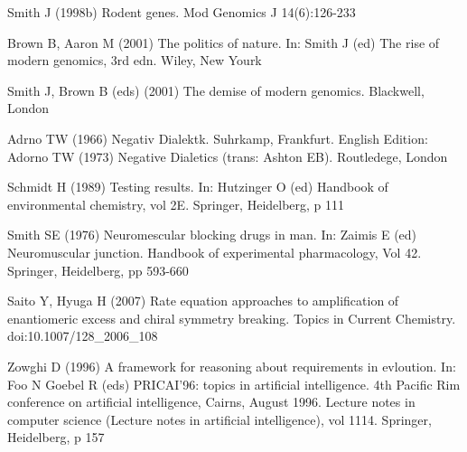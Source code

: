 \documentclass{EPS}
\begin{document}
\begin{thebibliography}{}
Smith J (1998b)
Rodent genes. Mod Genomics J 14(6):126-233

Brown B, Aaron M (2001)
The politics of nature. In: Smith J (ed)
The rise of modern genomics, 3rd edn. Wiley, New Yourk

Smith J, Brown B (eds) (2001)
The demise of modern genomics. Blackwell, London

Adrno TW (1966)
Negativ Dialektk. Suhrkamp, Frankfurt.
English Edition: Adorno TW (1973)
Negative Dialetics (trans: Ashton EB). Routledege, London

Schmidt H (1989)
Testing results. In: Hutzinger O (ed)
Handbook of environmental chemistry, vol 2E.
Springer, Heidelberg, p 111

Smith SE (1976)
Neuromescular blocking drugs in man.
In: Zaimis E (ed) Neuromuscular junction.
Handbook of experimental pharmacology, Vol 42.
Springer, Heidelberg, pp 593-660

Saito Y, Hyuga H (2007)
Rate equation approaches to amplification of enantiomeric excess
and chiral symmetry breaking.
Topics in Current Chemistry. doi:10.1007/128\_2006\_108

Zowghi D (1996)
A framework for reasoning about requirements in evloution.
In: Foo N Goebel R (eds) PRICAI'96: topics in artificial intelligence.
4th Pacific Rim conference on artificial intelligence,
Cairns, August 1996.
Lecture notes in computer science
(Lecture notes in artificial intelligence), vol 1114.
Springer, Heidelberg, p 157


\end{thebibliography}
\end{document}
